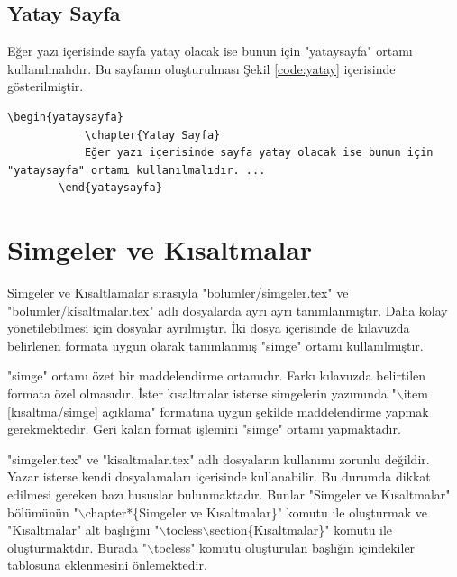\begin{yataysayfa}
	\chapter{Yatay Sayfa}
	Eğer yazı içerisinde sayfa yatay olacak ise bunun için "yataysayfa" ortamı kullanılmalıdır. Bu sayfanın oluşturulması Şekil \ref{code:yatay} içerisinde gösterilmiştir.
	
	\begin{lstlisting}[language={[LaTeX]{TeX}}, label=code:yatay, caption=Yatay sayfa oluşturulması]
		\begin{yataysayfa}
			\chapter{Yatay Sayfa}
			Eğer yazı içerisinde sayfa yatay olacak ise bunun için "yataysayfa" ortamı kullanılmalıdır. ...
		\end{yataysayfa}
	\end{lstlisting}

\end{yataysayfa}



\chapter{Simgeler ve Kısaltmalar}
\label{ch:simge}
Simgeler ve Kısaltlamalar sırasıyla "bolumler/simgeler.tex" ve "bolumler/kisaltmalar.tex" adlı dosyalarda ayrı ayrı tanımlanmıştır. Daha kolay yönetilebilmesi için dosyalar ayrılmıştır. İki dosya içerisinde de kılavuzda belirlenen formata uygun olarak tanımlanmış "simge" ortamı kullanılmıştır. 

"simge" ortamı özet bir maddelendirme ortamıdır. Farkı kılavuzda belirtilen formata özel olmasıdır. İster kısaltmalar isterse simgelerin yazımında "$\backslash$item [kısaltma/simge] açıklama" formatına uygun şekilde maddelendirme yapmak gerekmektedir. Geri kalan format işlemini "simge" ortamı yapmaktadır. 

"simgeler.tex" ve "kisaltmalar.tex" adlı dosyaların kullanımı zorunlu değildir. Yazar isterse kendi dosyalamaları içerisinde kullanabilir. Bu durumda dikkat edilmesi gereken bazı hususlar bulunmaktadır. Bunlar "Simgeler ve Kısaltmalar" bölümünün "$\backslash$chapter*\{Simgeler ve Kısaltmalar\}" komutu ile oluşturmak ve "Kısaltmalar" alt başlığını "$\backslash$tocless$\backslash$section\{Kısaltmalar\}" komutu ile oluşturmaktdır. Burada "$\backslash$tocless" komutu oluşturulan başlığın içindekiler tablosuna eklenmesini önlemektedir. 


